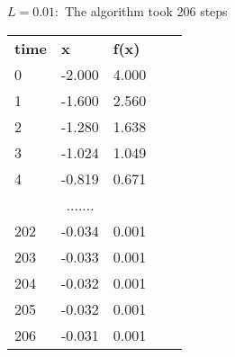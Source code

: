 \documentclass{article}
\begin{document}
\textbf{$L = 0.01:$} The algorithm took 206 steps
    \begin{table}[]
        \begin{tabular}{|lll|ll}
        \cline{1-3}
        \multicolumn{1}{|l|}{\textbf{time}} & \multicolumn{1}{l|}{\textbf{x}} & \textbf{f(x)} &  &  \\ \cline{1-3}
        \multicolumn{1}{|l|}{0}             & \multicolumn{1}{l|}{-2.000}     & 4.000         &  &  \\ \cline{1-3}
        \multicolumn{1}{|l|}{1}             & \multicolumn{1}{l|}{-1.600}     & 2.560         &  &  \\ \cline{1-3}
        \multicolumn{1}{|l|}{2}             & \multicolumn{1}{l|}{-1.280}     & 1.638         &  &  \\ \cline{1-3}
        \multicolumn{1}{|l|}{3}             & \multicolumn{1}{l|}{-1.024}     & 1.049         &  &  \\ \cline{1-3}
        \multicolumn{1}{|l|}{4}             & \multicolumn{1}{l|}{-0.819}     & 0.671         &  &  \\ \cline{1-3}
        \multicolumn{3}{|c|}{.......}                                                         &  &  \\ \cline{1-3}
        \multicolumn{1}{|l|}{202}           & \multicolumn{1}{l|}{-0.034}     & 0.001         &  &  \\ \cline{1-3}
        \multicolumn{1}{|l|}{203}           & \multicolumn{1}{l|}{-0.033}     & 0.001         &  &  \\ \cline{1-3}
        \multicolumn{1}{|l|}{204}           & \multicolumn{1}{l|}{-0.032}     & 0.001         &  &  \\ \cline{1-3}
        \multicolumn{1}{|l|}{205}           & \multicolumn{1}{l|}{-0.032}     & 0.001         &  &  \\ \cline{1-3}
        \multicolumn{1}{|l|}{206}           & \multicolumn{1}{l|}{-0.031}     & 0.001         &  &  \\ \cline{1-3}
        \end{tabular}
        \end{table}
\end{document}
